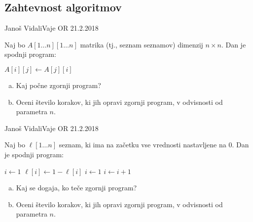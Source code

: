 \subsection{Zahtevnost algoritmov}

\begin{naloga}{}{Janoš Vidali}{Vaje OR 21.2.2018}
\begin{vprasanje}
Naj bo $A[1 \dots n][1 \dots n]$ matrika (tj., seznam seznamov)
dimenzij $n \times n$.
Dan je spodnji program:
\begin{small}
\begin{algorithmic}
        \State $A[i][j] \gets A[j][i]$
    \EndFor
\EndFor
\end{algorithmic}
\end{small}


\begin{enumerate}[(a)]
\item Kaj počne zgornji program?
\item Oceni število korakov, ki jih opravi zgornji program,
v odvisnosti od parametra $n$.
\end{enumerate}
\end{vprasanje}
\begin{odgovor}
\end{odgovor}
\end{naloga}


\begin{naloga}{}{Janoš Vidali}{Vaje OR 21.2.2018}
\begin{vprasanje}
Naj bo $\ell[1 \dots n]$ seznam,
ki ima na začetku vse vrednosti nastavljene na $0$.
Dan je spodnji program:

\begin{small}
\begin{algorithmic}
\State $i \gets 1$
    \State $\ell[i] \gets 1 - \ell[i]$
        \State $i \gets 1$
    \Else
        \State $i \gets i+1$
    \EndIf
\EndWhile
\end{algorithmic}
\end{small}

\begin{enumerate}[(a)]
\item Kaj se dogaja, ko teče zgornji program?
\item Oceni število korakov, ki jih opravi zgornji program,
v odvisnosti od parametra $n$.
\end{enumerate}

\end{vprasanje}
\begin{odgovor}
\end{odgovor}
\end{naloga}


